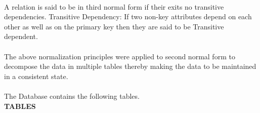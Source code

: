 \documentclass[a4paper, 12pt]{report}
\begin{document}
\paragraph{}A relation is said to be in third normal form if their exits no transitive dependencies.
Transitive Dependency: If two non-key attributes depend on each other as well as on the
primary key then they are said to be Transitive dependent.
\paragraph{}The above normalization principles were applied to second normal form to
decompose the data in multiple tables thereby making the data to be maintained in a
consistent state.
\paragraph{}The Database contains the following tables.\\
\textbf{TABLES}
\end{document}
